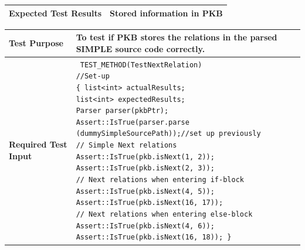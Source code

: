 \documentclass[12pt]{article}
\begin{document}
{{{{{{{{{{{{{\begin{tabular}{|L{5cm} | L{12cm}| }
\textbf{Expected Test Results}
 &
Stored information in PKB
 \\\hline

\end{tabular}

\begin{longtable}{|p{5cm} | p{12cm}| }
\hline
\textbf{Test Purpose} &
To test if PKB stores the relations in the parsed SIMPLE source code correctly.
\\\hline
\textbf{Required Test Input}
 &
 \texttt{
 \noindent TEST\_METHOD(TestNextRelation)
\newline \vspace{2mm} \hspace{4mm} //Set-up \newline
 \{ \hspace{2mm} list<int> actualResults; \newline \vspace{2mm}
 \hspace{4mm} list<int> expectedResults; \newline
  \hspace{4mm} Parser parser(pkbPtr); \newline
 \hspace{9mm}  Assert::IsTrue(parser.parse\newline(dummySimpleSourcePath));//set up previously \newline \vspace{2mm}
 \hspace{9mm} // Simple Next relations \newline
 \hspace{9mm} Assert::IsTrue(pkb.isNext(1, 2));\newline 
 \hspace{9mm} Assert::IsTrue(pkb.isNext(2, 3)); \newline \vspace{2mm}
 \hspace{9mm}  // Next relations when entering if-block\newline 
 \hspace{9mm}   Assert::IsTrue(pkb.isNext(4, 5));\newline 
  \hspace{9mm}   Assert::IsTrue(pkb.isNext(16, 17));\newline \vspace{2mm}
  \hspace{9mm}  // Next relations when entering else-block\newline 
 \hspace{9mm}   Assert::IsTrue(pkb.isNext(4, 6));\newline 
 \hspace{9mm}  Assert::IsTrue(pkb.isNext(16, 18)); \} }


\end{longtable}}}}}}}}}}}}}}
\end{document}
